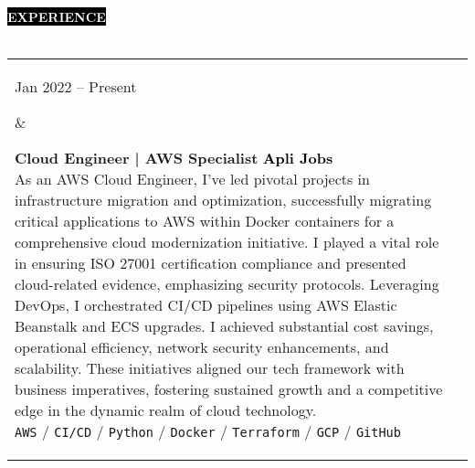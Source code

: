 \documentclass[10pt,A4]{article}
\makeatletter
\newcounter{a}
\newcounter{b}
\newcounter{c}
\newcommand{\cvsection}[1] {
	\textcolor{white}{\MakeUppercase{\textbf{#1}}}
}
\newcommand{\cvsect}[1]{
	\colorbox{black}{{\cvsection{#1}}}\\\\%
}
\newenvironment{entrylist}{%
	\begin{tabular*}{\textwidth}[t]{@{\extracolsep{\fill}}ll}
	}{%
	\end{tabular*}
}
\newcommand{\entry}[4]{%
	\parbox[t]{3.5cm}{%
		#1%
	}%
	&\parbox[t]{14cm}{%
		\textbf{#2}%
		\hfill%
		{\footnotesize \textbf{\textcolor{black}{#3}}}\\%
		#4%
	}\\\\}
\newcommand{\slashsep}{
	\hspace{2mm}/\hspace{2mm}
}
\makeatother
\begin{document}
	
	\cvsect{Experience}
	\begin{entrylist}
		\entry
		{Jan 2022 – Present}
		{Cloud Engineer | AWS Specialist}
		{Apli Jobs}
		{As an AWS Cloud Engineer, I've led pivotal projects in infrastructure
		migration and optimization, successfully migrating critical applications to AWS
		within Docker containers for a comprehensive cloud modernization initiative. I
		played a vital role in ensuring ISO 27001 certification compliance and presented
		cloud-related evidence, emphasizing security protocols.
		\hfil\break
		Leveraging DevOps, I orchestrated CI/CD pipelines using AWS Elastic Beanstalk and
		ECS upgrades. I achieved substantial cost savings, operational efficiency, network
		security enhancements, and scalability. These initiatives aligned our tech framework
		with business imperatives, fostering sustained growth and a competitive edge in the
		dynamic realm of cloud technology.\\
			\texttt{AWS}\slashsep\texttt{CI/CD}\slashsep\texttt{Python}\slashsep\texttt{Docker}\slashsep\texttt{Terraform}\slashsep\texttt{GCP}\slashsep\texttt{GitHub}}
		\entry
		{Feb 2021 – Jan 2022}
		{Backend Developer + AWS Cloud Engineer}
		{Galaxy Technology}
		{As a Backend Engineer and Team Lead, I crafted REST APIs and oversaw database
		management using Node.js with Express and Sequelize. My role extended to hosting
		essential services within AWS, employing tools like Lambda, API Gateway,
		AppSync, DynamoDB, SNS, and SQS. Collaborating closely with customers, I addressed
		change requests and implemented new functionalities, enhancing our services to
		meet evolving needs.\\
			\texttt{Node.js}\slashsep\texttt{Express}\slashsep\texttt{Sequelize}\slashsep\texttt{AWS}\slashsep\texttt{GraphQL}}
		\entry
		{April 2020 – Oct 2020}
		{Junior React Native Developer}
		{Cubo Rojo}
		{As a Full-stack Developer, I led the development of a React Native app integrated
		with Firebase, featuring a non-relational database and serving as a robust user
		authentication handler. This application revolutionized the company's workflow by
		automating user requests and computer configuration processes. The impactful result
		was a significant reduction in response time, transitioning from 30 minutes to
		real-time interactions.\\
			\texttt{React Native}\slashsep\texttt{Node.js}\slashsep\texttt{Python}\slashsep\texttt{Ubuntu Server}\slashsep\texttt{Firebase}}
	\end{entrylist}
	\\\\
\end{document}
